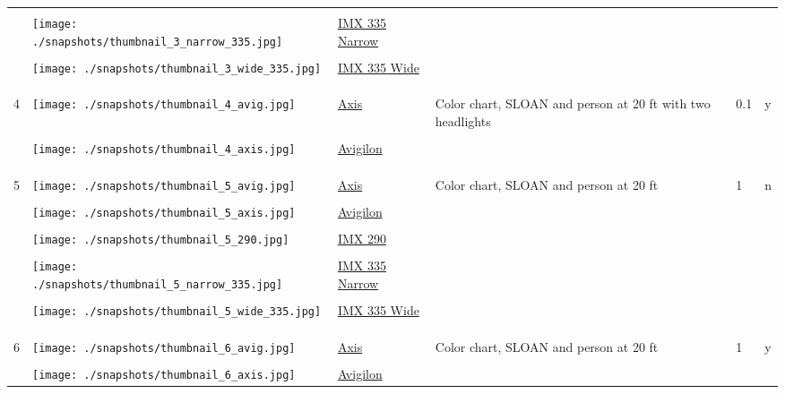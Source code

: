 \documentclass{article}%
\begin{document}
\begin{longtabu}{m{2.5cm} m{4cm} m{2cm} m{4cm} m{2cm} m{2cm}}
&&&&&\\%
&\texttt{[image: ./snapshots/thumbnail\_3\_narrow\_335.jpg]}&\href{https://google.com}{IMX 335 Narrow}&&&\\%
&&&&&\\%
&\texttt{[image: ./snapshots/thumbnail\_3\_wide\_335.jpg]}&\href{https://google.com}{IMX 335 Wide}&&&\\%
&&&&&\\%
&&&&&\\%
\hline%
&&&&&\\%
4&\texttt{[image: ./snapshots/thumbnail\_4\_avig.jpg]}&\href{https://google.com}{Axis}&Color chart, SLOAN and person at 20 ft with two headlights&0.1&y\\%
&&&&&\\%
&\texttt{[image: ./snapshots/thumbnail\_4\_axis.jpg]}&\href{https://google.com}{Avigilon}&&&\\%
&&&&&\\%
&&&&&\\%
\hline%
&&&&&\\%
5&\texttt{[image: ./snapshots/thumbnail\_5\_avig.jpg]}&\href{https://google.com}{Axis}&Color chart, SLOAN and person at 20 ft&1&n\\%
&&&&&\\%
&\texttt{[image: ./snapshots/thumbnail\_5\_axis.jpg]}&\href{https://google.com}{Avigilon}&&&\\%
&&&&&\\%
&\texttt{[image: ./snapshots/thumbnail\_5\_290.jpg]}&\href{https://google.com}{IMX 290}&&&\\%
&&&&&\\%
&\texttt{[image: ./snapshots/thumbnail\_5\_narrow\_335.jpg]}&\href{https://google.com}{IMX 335 Narrow}&&&\\%
&&&&&\\%
&\texttt{[image: ./snapshots/thumbnail\_5\_wide\_335.jpg]}&\href{https://google.com}{IMX 335 Wide}&&&\\%
&&&&&\\%
&&&&&\\%
\hline%
&&&&&\\%
6&\texttt{[image: ./snapshots/thumbnail\_6\_avig.jpg]}&\href{https://google.com}{Axis}&Color chart, SLOAN and person at 20 ft&1&y\\%
&&&&&\\%
&\texttt{[image: ./snapshots/thumbnail\_6\_axis.jpg]}&\href{https://google.com}{Avigilon}&&&\\%

\end{longtabu}
\end{document}
